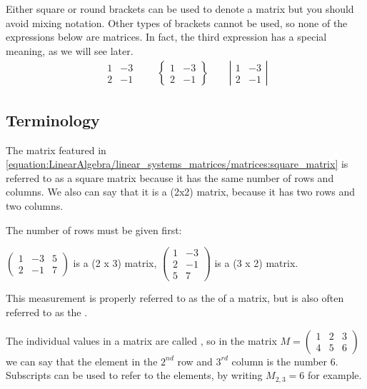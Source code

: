 \documentclass[letterpaper,10pt,english]{jupyterBook}
\begin{document}
\sphinxAtStartPar
Either square or round brackets can be used to denote a matrix \sphinxhyphen{} but you should avoid mixing notation. Other types of brackets cannot be used, so none of the expressions below are matrices. In fact, the third expression has a special meaning, as we will see later.
\label{equation:LinearAlgebra/linear_systems_matrices/matrices:1d40cf03-f440-4674-98f0-3fc7a6847240}\begin{align}\begin{matrix} 1 & -3 \\ 2 & -1 \end{matrix} \qquad \left\{ \begin{matrix} 1 & -3 \\ 2 & -1 \end{matrix} \right\} \qquad \left| \begin{matrix} 1 & -3 \\ 2 & -1 \end{matrix} \right|	\end{align}

\subsection{Terminology}
\label{\detokenize{LinearAlgebra/linear_systems_matrices/matrices:terminology}}
\sphinxAtStartPar
The matrix featured in \eqref{equation:LinearAlgebra/linear_systems_matrices/matrices:square_matrix} is referred to as a square matrix because it has the same number of rows and columns. We also can say that it is a (2x2) matrix, because it has two rows and two columns.

\sphinxAtStartPar
The number of rows must be given first:

\sphinxAtStartPar
\( \left( \begin{matrix} 1 & -3 & 5\\ 2 & -1 & 7\end{matrix} \right) \)  is a (2 x 3) matrix, \( \left( \begin{matrix} 1 & -3 \\ 2 & -1 \\ 5 & 7\end{matrix} \right) \) is a (3 x 2) matrix.

\sphinxAtStartPar
This measurement is properly referred to as the  of a matrix, but is also often referred to as the .

\sphinxAtStartPar
The individual values in a matrix are called , so in the matrix \( M = \left( \begin{matrix} 1 &2 &3 \\ 4& 5& 6\end{matrix} \right) \) we can say that the element in the \(2^{nd}\) row and \(3^{rd}\) column is the number 6. Subscripts can be used to refer to the elements, by writing \( M_{2,3} = 6\) for example.
\end{document}
